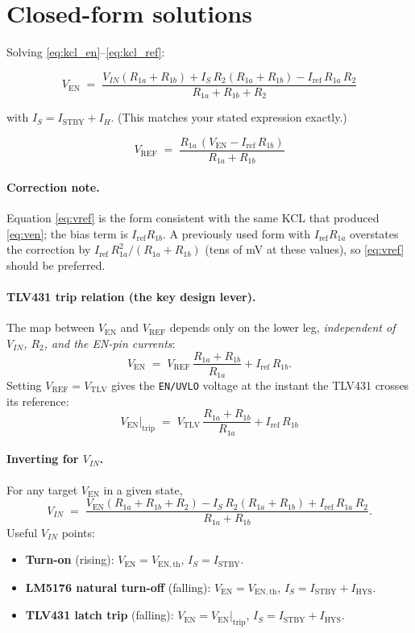 \documentclass[11pt]{article}
\newcommand{\Ven}{V_{\mathrm{EN}}}
\newcommand{\Vref}{V_{\mathrm{REF}}}
\newcommand{\Vtlv}{V_{\mathrm{TLV}}}
\newcommand{\Vth}{V_{\mathrm{EN,th}}}
\newcommand{\Iref}{I_{\mathrm{ref}}}
\newcommand{\Istby}{I_{\mathrm{STBY}}}
\newcommand{\Ihys}{I_{\mathrm{HYS}}}
\newcommand{\IH}{I_{H}}
\newcommand{\Rone}{R_{1a}}
\newcommand{\Rtwo}{R_{1b}}
\newcommand{\Rt}{R_{2}}
\begin{document}
\section{Closed-form solutions}

Solving \eqref{eq:kcl_en}--\eqref{eq:kcl_ref}:

\begin{equation}
\boxed{\;\Ven \;=\; \frac{V_{IN}(\Rone+\Rtwo)+I_S\,\Rt(\Rone+\Rtwo)-\Iref\,\Rone\,\Rt}{\Rone+\Rtwo+\Rt}\;}
\label{eq:ven}
\end{equation}

with $I_S=\Istby+\IH$. (This matches your stated expression exactly.)

\begin{equation}
\boxed{\;\Vref \;=\; \frac{\Rone\,(\Ven-\Iref\,\Rtwo)}{\Rone+\Rtwo}\;}
\label{eq:vref}
\end{equation}

\paragraph{Correction note.} Equation \eqref{eq:vref} is the form consistent with the
same KCL that produced \eqref{eq:ven}; the bias term is $\Iref\Rtwo$. A previously used
form with $\Iref\Rone$ overstates the correction by $\Iref\,\Rone^{2}/(\Rone+\Rtwo)$
(tens of mV at these values), so \eqref{eq:vref} should be preferred.

\paragraph{TLV431 trip relation (the key design lever).}
The map between $\Ven$ and $\Vref$ depends only on the lower leg, \emph{independent of
$V_{IN}$, $\Rt$, and the EN-pin currents}:
\begin{equation}
\Ven \;=\; \Vref\,\frac{\Rone+\Rtwo}{\Rone}+\Iref\,\Rtwo .
\label{eq:vref_to_ven}
\end{equation}
Setting $\Vref=\Vtlv$ gives the \texttt{EN/UVLO} voltage at the instant the TLV431
crosses its reference:
\begin{equation}
\boxed{\;\Ven\big|_{\mathrm{trip}} \;=\; \Vtlv\,\frac{\Rone+\Rtwo}{\Rone}+\Iref\,\Rtwo\;}
\label{eq:ven_trip}
\end{equation}

\paragraph{Inverting for $V_{IN}$.} For any target $\Ven$ in a given state,
\begin{equation}
V_{IN}\;=\;\frac{\Ven(\Rone+\Rtwo+\Rt)-I_S\,\Rt(\Rone+\Rtwo)+\Iref\,\Rone\,\Rt}{\Rone+\Rtwo}.
\label{eq:vin}
\end{equation}
Useful $V_{IN}$ points:
\begin{itemize}[nosep]
\item \textbf{Turn-on} (rising): $\Ven=\Vth$, $I_S=\Istby$.
\item \textbf{LM5176 natural turn-off} (falling): $\Ven=\Vth$, $I_S=\Istby+\Ihys$.
\item \textbf{TLV431 latch trip} (falling): $\Ven=\Ven|_{\mathrm{trip}}$, $I_S=\Istby+\Ihys$.
\end{itemize}
\end{document}
